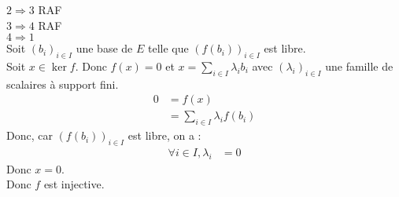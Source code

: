 \documentclass[../main.tex]{subfiles}
\begin{document}
$\boxed{2 \Rightarrow 3}$ RAF \\

$\boxed{3 \Rightarrow 4}$ RAF \\

$\boxed{4 \Rightarrow 1}$ \\
Soit $(b_i)_{i\in I}$ une base de $E$ telle que $(f(b_i))_{i\in I}$ est libre. \\
Soit $x\in \ker f$. Donc $f(x) = 0$ et $x = \sum\limits_{i\in I} \lambda_i b_i$ avec $(\lambda_i)_{i\in I}$ une famille de scalaires à support fini. \\
\begin{align*}
    0 &= f(x) \\
    &= \sum_{i\in I} \lambda_i f(b_i)
\end{align*}
Donc, car $(f(b_i))_{i\in I}$ est libre, on a : 
\begin{align*}
    \forall i \in I, \lambda_i &= 0
\end{align*}
Donc $x = 0$. \\
Donc $f$ est injective. 
\end{document}

